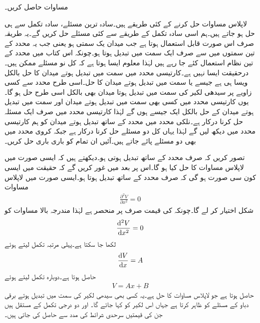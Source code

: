 مساوات  حاصل کریں۔

لاپلاس مساوات حل کرنے کے کئی طریقے ہیں۔سادہ ترین مسئلے، سادہ تکمل سے ہی حل ہو جاتے ہیں۔ہم اسی سادہ تکمل کے طریقے سے کئی مسئلے حل کریں گے۔یہ طریقہ صرف اس صورت قابل استعمال ہوتا ہے جب میدان یک سمتی ہو یعنی جب یہ محدد کے تین سمتوں میں سے صرف ایک سمت میں تبدیل ہوتا ہو۔چونکہ اس کتاب میں محدد کے تین نظام استعمال کئے جا رہے ہیں لہٰذا معلوم ایسا ہوتا ہے کہ  کل نو مسئلے ممکن ہیں۔درحقیقت ایسا نہیں ہے۔کارتیسی محدد میں  سمت میں تبدیل ہوتے میدان کا حل بالکل ویسا ہی ہے جیسے  یا  سمت میں تبدیل ہوتے میدان کا حل۔اسی طرح  محدد سے کسی زاویے پر سیدھی لکیر کی سمت میں تبدیل ہوتا میدان بھی بالکل اسی طرح حل ہو گا۔یوں کارتیسی محدد میں کسی بھی سمت میں تبدیل ہوتے میدان اور  سمت میں تبدیل ہوتے میدان کے حل بالکل ایک جیسے ہوں گے لہٰذا کارتیسی محدد میں صرف ایک مسئلہ حل کرنا درکار ہے۔نلکی محدد میں  محدد کے ساتھ تبدیل ہوتے میدان کو ہم کارتیسی محدد میں دیکھ لیں گے لہٰذا یہاں کل دو مسئلے حل کرنا درکار ہے جبکہ کروی محدد میں بھی دو مسئلے پائے جاتے ہیں۔آئیں ان تمام کو باری باری حل کریں۔

تصور کریں کہ  صرف  محدد کے ساتھ تبدیل ہوتی ہو۔دیکھتے ہیں کہ ایسی صورت میں لاپلاس مساوات کا حل کیا ہو گا۔اس پر بعد میں غور کریں گے کہ حقیقت میں ایسی کون سی صورت ہو گی کہ  صرف  محدد کے ساتھ تبدیل ہوتا ہو۔ایسی صورت میں لاپلاس مساوات
\begin{align*}
\frac{\partial^2 V}{\partial x^2}=0
\end{align*}
شکل اختیار کر لے گا۔چونکہ  کی قیمت صرف  پر منحصر ہے لہٰذا مندرجہ بالا مساوات کو
\begin{align*}
\frac{\dif{\hspace{0.1pt} ^2} V}{\dif x^2}=0
\end{align*}
لکھا جا سکتا ہے۔پہلی مرتبہ تکمل لیتے ہوئے
\begin{align*}
\frac{\dif V}{\dif x}=A
\end{align*}
حاصل ہوتا ہے۔دوبارہ تکمل لیتے ہوئے
\begin{align}\label{مساوات_لاپلاس_کارتیسی_حل}
V=Ax+B
\end{align}
حاصل ہوتا ہے جو لاپلاس مساوات کا حل ہے۔یہ کسی بھی سیدھی لکیر کی سمت میں تبدیل ہوتے برقی دباو کے مسئلے کو ظاہر کرتا ہے جہاں اس لکیر کو  کہا جائے گا۔ اور  دو درجی تکمل کے مستقل ہیں جن کی قیمتیں سرحدی شرائط کی مدد سے حاصل کی جاتی ہیں۔

